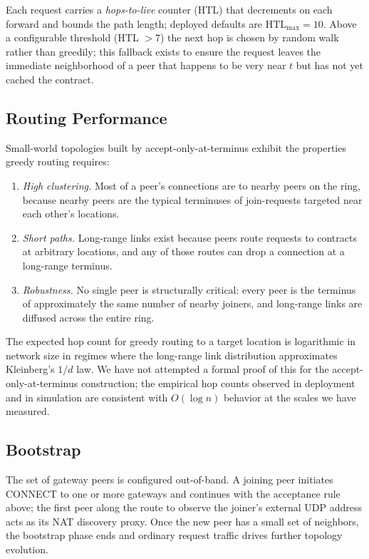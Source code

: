 Each request carries a \emph{hops-to-live} counter (HTL) that decrements on each forward and bounds the path length; deployed defaults are $\mathrm{HTL}_{\max} = 10$. Above a configurable threshold (HTL $> 7$) the next hop is chosen by random walk rather than greedily; this fallback exists to ensure the request leaves the immediate neighborhood of a peer that happens to be very near $t$ but has not yet cached the contract.

\subsection{Routing Performance}

Small-world topologies built by accept-only-at-terminus exhibit the properties greedy routing requires:

\begin{enumerate}[leftmargin=*, itemsep=2pt]
  \item \emph{High clustering.} Most of a peer's connections are to nearby peers on the ring, because nearby peers are the typical terminuses of join-requests targeted near each other's locations.
  \item \emph{Short paths.} Long-range links exist because peers route requests to contracts at arbitrary locations, and any of those routes can drop a connection at a long-range terminus.
  \item \emph{Robustness.} No single peer is structurally critical: every peer is the terminus of approximately the same number of nearby joiners, and long-range links are diffused across the entire ring.
\end{enumerate}

The expected hop count for greedy routing to a target location is logarithmic in network size in regimes where the long-range link distribution approximates Kleinberg's $1/d$ law. We have not attempted a formal proof of this for the accept-only-at-terminus construction; the empirical hop counts observed in deployment and in simulation are consistent with $O(\log n)$ behavior at the scales we have measured.

\subsection{Bootstrap}

The set of gateway peers is configured out-of-band. A joining peer initiates \textsf{CONNECT} to one or more gateways and continues with the acceptance rule above; the first peer along the route to observe the joiner's external UDP address acts as its NAT discovery proxy. Once the new peer has a small set of neighbors, the bootstrap phase ends and ordinary request traffic drives further topology evolution.
